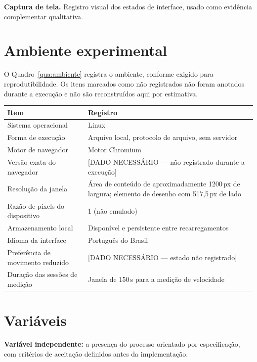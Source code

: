 \textbf{Captura de tela.} Registro visual dos estados de interface, usado como
evidência complementar qualitativa.

\section{Ambiente experimental}
\label{sec:ambiente}

O Quadro~\ref{qua:ambiente} registra o ambiente, conforme exigido para
reprodutibilidade. Os itens marcados como não registrados não foram anotados
durante a execução e não são reconstruídos aqui por estimativa.

\begin{quadro}[htb]
	\caption{Ambiente experimental registrado}
	\label{qua:ambiente}
	\centering
	\footnotesize
	\begin{tabularx}{\textwidth}{@{}p{4.2cm} X@{}}
		\toprule
		\textbf{Item} & \textbf{Registro} \\
		\midrule
		Sistema operacional & Linux \\
		Forma de execução & Arquivo local, protocolo de arquivo, sem servidor \\
		Motor de navegador & Motor Chromium \\
		Versão exata do navegador & [DADO NECESSÁRIO --- não registrado durante a execução] \\
		Resolução da janela & Área de conteúdo de aproximadamente 1200\,px de largura; elemento de desenho com 517,5\,px de lado \\
		Razão de pixels do dispositivo & 1 (não emulado) \\
		Armazenamento local & Disponível e persistente entre recarregamentos \\
		Idioma da interface & Português do Brasil \\
		Preferência de movimento reduzido & [DADO NECESSÁRIO --- estado não registrado] \\
		Duração das sessões de medição & Janela de 150\,s para a medição de velocidade \\
		\bottomrule
	\end{tabularx}
\end{quadro}

\section{Variáveis}
\label{sec:variaveis}

\textbf{Variável independente:} a presença do processo orientado por
especificação, com critérios de aceitação definidos antes da implementação.

